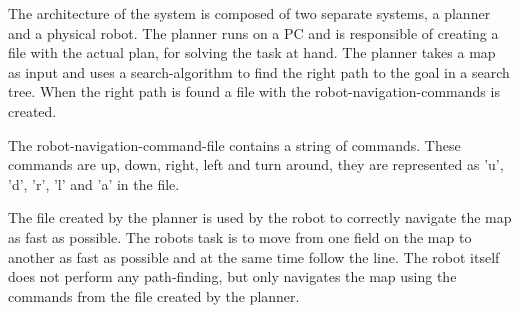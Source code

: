 The architecture of the system is composed of two separate systems, a planner and a physical robot.
The planner runs on a PC and is responsible of creating a file with the actual plan, for solving the task at hand. The planner takes a map as input and uses a search-algorithm to find the right path to the goal in a search tree. When the right path is found a file with the robot-navigation-commands is created.

The robot-navigation-command-file contains a string of commands. These commands are up, down, right, left and turn around, they are represented as 'u', 'd', 'r', 'l' and 'a' in the file.

The file created by the planner is used by the robot to correctly navigate the map as fast as possible. The robots task is to move from one field on the map to another as fast as possible and at the same time follow the line.  The robot itself does not perform any path-finding, but only navigates the map using the commands from the file created by the planner. 

